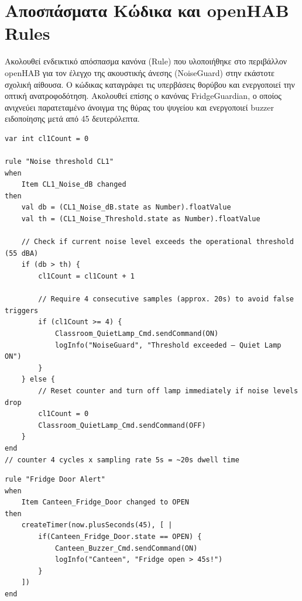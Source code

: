\chapter{Αποσπάσματα Κώδικα και \textlatin{openHAB Rules}}

Ακολουθεί ενδεικτικό απόσπασμα κανόνα (\textlatin{Rule}) που υλοποιήθηκε στο περιβάλλον \textlatin{openHAB} για τον έλεγχο της
ακουστικής άνεσης (\textlatin{NoiseGuard}) στην εκάστοτε σχολική αίθουσα. Ο κώδικας καταγράφει τις υπερβάσεις θορύβου και
ενεργοποιεί την οπτική ανατροφοδότηση. Ακολουθεί επίσης ο κανόνας \textlatin{FridgeGuardian}, ο οποίος ανιχνεύει παρατεταμένο άνοιγμα της θύρας του ψυγείου και ενεργοποιεί \textlatin{buzzer} ειδοποίησης μετά από 45 δευτερόλεπτα.

\begin{lstlisting}[caption={Ενδεικτικός κανόνας \textlatin{NoiseGuard} σε \textlatin{openHAB}},label={lst:noiseguard_rule}]
var int cl1Count = 0

rule "Noise threshold CL1"
when
    Item CL1_Noise_dB changed
then
    val db = (CL1_Noise_dB.state as Number).floatValue
    val th = (CL1_Noise_Threshold.state as Number).floatValue
    
    // Check if current noise level exceeds the operational threshold (55 dBA)
    if (db > th) {
        cl1Count = cl1Count + 1
        
        // Require 4 consecutive samples (approx. 20s) to avoid false triggers
        if (cl1Count >= 4) {
            Classroom_QuietLamp_Cmd.sendCommand(ON)
            logInfo("NoiseGuard", "Threshold exceeded — Quiet Lamp ON")
        }
    } else {
        // Reset counter and turn off lamp immediately if noise levels drop
        cl1Count = 0
        Classroom_QuietLamp_Cmd.sendCommand(OFF)
    }
end
// counter 4 cycles x sampling rate 5s = ~20s dwell time
\end{lstlisting}

\begin{lstlisting}[caption={Ενδεικτικός κανόνας \textlatin{FridgeGuardian} σε \textlatin{openHAB}},label={lst:fridgeguardian_rule}]
rule "Fridge Door Alert"
when
    Item Canteen_Fridge_Door changed to OPEN
then
    createTimer(now.plusSeconds(45), [ |
        if(Canteen_Fridge_Door.state == OPEN) {
            Canteen_Buzzer_Cmd.sendCommand(ON)
            logInfo("Canteen", "Fridge open > 45s!")
        }
    ])
end
\end{lstlisting}


